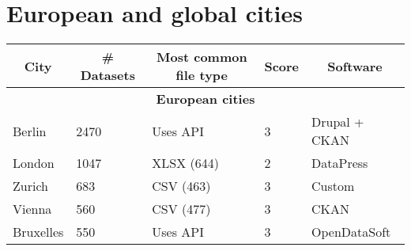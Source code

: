 \section{European and global cities}
\label{sec:other-cities}

\begin{table}[!ht]
  \onehalfspacing
  \centering
  \begin{tabular}{|lllll|}
    \hline
    \multicolumn{1}{|c|}{\textbf{City}} & \multicolumn{1}{c|}{\textbf{\# Datasets}} & \multicolumn{1}{c|}{\textbf{Most common file type}} & \multicolumn{1}{c|}{\textbf{Score}} & \multicolumn{1}{c|}{\textbf{Software}} \\ \hline
    \multicolumn{5}{|c|}{\textbf{European cities}}    \\ \hline
    \multicolumn{1}{|l|}{Berlin}                      & \multicolumn{1}{|l|}{2470}                                             & \multicolumn{1}{|l|}{Uses \acs{API}}                                                  & \multicolumn{1}{|l|}{3}        & \multicolumn{1}{|l|}{Drupal + CKAN}                                   \\ \hline
    \multicolumn{1}{|l|}{London}                      & \multicolumn{1}{|l|}{1047}                                             & \multicolumn{1}{|l|}{XLSX (644)}                                                      & \multicolumn{1}{|l|}{2}        & \multicolumn{1}{|l|}{DataPress}                                   \\ \hline
    \multicolumn{1}{|l|}{Zurich}                      & \multicolumn{1}{|l|}{683}                                              & \multicolumn{1}{|l|}{CSV (463)}                                                       & \multicolumn{1}{|l|}{3}        & \multicolumn{1}{|l|}{Custom}                                   \\ \hline
    \multicolumn{1}{|l|}{Vienna}                      & \multicolumn{1}{|l|}{560}                                              & \multicolumn{1}{|l|}{CSV (477)}                                                       & \multicolumn{1}{|l|}{3}        & \multicolumn{1}{|l|}{CKAN}                                   \\ \hline
    \multicolumn{1}{|l|}{Bruxelles}                   & \multicolumn{1}{|l|}{550}                                              & \multicolumn{1}{|l|}{Uses \acs{API}}                                                  & \multicolumn{1}{|l|}{3}        & \multicolumn{1}{|l|}{OpenDataSoft}                                   \\ \hline

\end{tabular}
\end{table}
